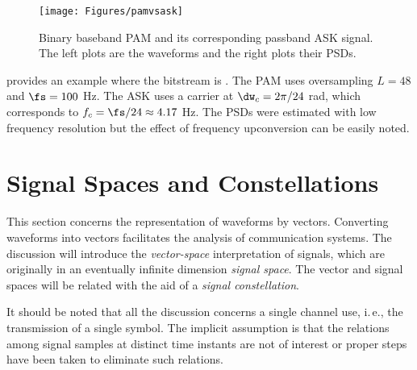 
\begin{figure}[htbp]
\centering
\texttt{[image: Figures/pamvsask]}
\caption{Binary baseband PAM and its corresponding passband ASK signal. The left plots are the waveforms and the right plots their PSDs.\label{fig:pamvsask}}
\end{figure}

 provides an example where the bitstream is \ci{[1 0 1 0 1 1 1 0]}. The PAM uses oversampling $L=48$ and $\fs=100$ Hz. The ASK uses a carrier at $\dw_c=2 \pi / 24$ rad, which corresponds to $f_c=\fs/24 \approx 4.17$ Hz. The PSDs were estimated with low frequency
resolution but the effect of frequency upconversion can be easily noted.
\eExample 




\section{Signal Spaces and Constellations}
This section concerns the representation of waveforms by vectors. Converting waveforms into vectors facilitates the analysis of communication systems. The discussion will introduce the \emph{vector-space} interpretation of signals, which are originally in an eventually infinite dimension \emph{signal space}.
The vector and signal spaces will be related with the aid of a \emph{signal constellation}.

It should be noted that all the discussion concerns a single channel use, i.\,e., the transmission of a single symbol. The implicit assumption is that the relations among signal samples at distinct time instants are not of interest or proper steps have been taken to eliminate such relations.

